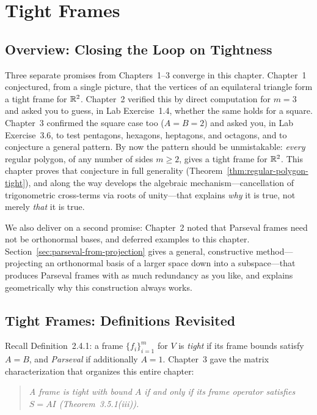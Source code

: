 \chapter{Tight Frames}
\label{ch:tight-frames}
\section{Overview: Closing the Loop on Tightness}
\label{sec:ch4-overview}

Three separate promises from Chapters~1--3 converge in this chapter.
Chapter~1 conjectured, from a single picture, that the vertices of an
equilateral triangle form a tight frame for $\mathbb{R}^2$. Chapter~2 verified
this by direct computation for $m=3$ and asked you to guess, in Lab
Exercise~1.4, whether the same holds for a square. Chapter~3 confirmed
the square case too ($A=B=2$) and asked you, in Lab Exercise~3.6, to
test pentagons, hexagons, heptagons, and octagons, and to conjecture a
general pattern. By now the pattern should be unmistakable: \emph{every}
regular polygon, of any number of sides $m\ge 2$, gives a tight frame for
$\mathbb{R}^2$. This chapter proves that conjecture in full generality
(Theorem~\ref{thm:regular-polygon-tight}), and along the way develops the
algebraic mechanism---cancellation of trigonometric cross-terms via roots
of unity---that explains \emph{why} it is true, not merely \emph{that}
it is true.

We also deliver on a second promise: Chapter~2 noted that Parseval
frames need not be orthonormal bases, and deferred examples to this
chapter. Section~\ref{sec:parseval-from-projection} gives a general,
constructive method---projecting an orthonormal basis of a larger space
down into a subspace---that produces Parseval frames with as much
redundancy as you like, and explains geometrically why this construction
always works.

\section{Tight Frames: Definitions Revisited}
\label{sec:tight-revisited}

Recall Definition~2.4.1: a frame $\{f_i\}_{i=1}^m$ for $V$ is \emph{tight}
if its frame bounds satisfy $A = B$, and \emph{Parseval} if additionally
$A=1$. Chapter~3 gave the matrix characterization that organizes this
entire chapter:

\begin{quote}
\itshape A frame is tight with bound $A$ if and only if its frame
operator satisfies $S = AI$ (Theorem~3.5.1(iii)).
\end{quote}

